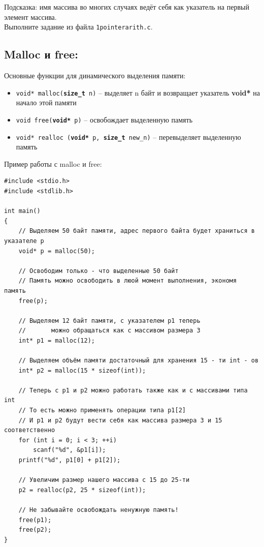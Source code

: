 \documentclass{article}
\begin{document}
Подсказка: имя массива во многих случаях ведёт себя как указатель на первый элемент массива. \\
Выполните задание из файла \texttt{1pointerarith.c}.

\subsection*{Malloc и free:}
Основные функции для динамического выделения памяти:
\begin{itemize}
\item \texttt{void* malloc(\textbf{size\_t} n)} -- выделяет n байт и возвращает указатель \textbf{void*}
на начало этой памяти \\
\item \texttt{void free(\textbf{void*} p)} -- освобождает выделенную память\\
\item \texttt{void* realloc (\textbf{void*} p, \textbf{size\_t} new\_n)} -- перевыделяет выделенную память\\
\end{itemize}

\newpage
Пример работы с malloc и free:
\begin{lstlisting}
#include <stdio.h>
#include <stdlib.h>

int main()
{
	// Выделяем 50 байт памяти, адрес первого байта будет храниться в указателе p
	void* p = malloc(50); 
	
	// Освободим только - что выделенные 50 байт
	// Память можно освободить в люой момент выполнения, экономя память
	free(p);              

	// Выделяем 12 байт памяти, с указателем p1 теперь
	//       можно обращаться как с массивом размера 3
	int* p1 = malloc(12); 
    
	// Выделяем объём памяти достаточный для хранения 15 - ти int - ов
	int* p2 = malloc(15 * sizeof(int)); 

	// Теперь с p1 и p2 можно работать также как и с массивами типа int
	// То есть можно применять операции типа p1[2]
	// И p1 и p2 будут вести себя как массива размера 3 и 15 соответственно
	for (int i = 0; i < 3; ++i)
		scanf("%d", &p1[i]);
	printf("%d", p1[0] + p1[2]);
	
	// Увеличим размер нашего массива с 15 до 25-ти
	p2 = realloc(p2, 25 * sizeof(int)); 
	
	// Не забывайте освобождать ненужную память!
	free(p1);
	free(p2);
}
\end{lstlisting}
\end{document}
